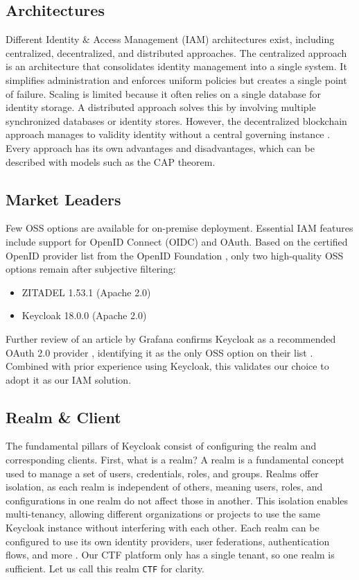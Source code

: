 \subsection{Architectures}
Different Identity \& Access Management (IAM) architectures exist, including centralized, decentralized, and distributed approaches. The centralized approach is an architecture that consolidates identity management into a single system. It simplifies administration and enforces uniform policies but creates a single point of failure. Scaling is limited because it often relies on a single database for identity storage. A distributed approach solves this by involving multiple synchronized databases or identity stores. However, the decentralized blockchain approach manages to validity identity without a central governing instance \cite{geeksforgeeks2025}. Every approach has its own advantages and disadvantages, which can be described with models such as the CAP theorem. 

\subsection{Market Leaders}
Few OSS options are available for on-premise deployment. Essential IAM features include support for OpenID Connect (OIDC) and OAuth. Based on the certified OpenID provider list from the OpenID Foundation \parencite{openidImplementations}, only two high-quality OSS options remain after subjective filtering:

\begin{itemize}
    \item ZITADEL 1.53.1 (Apache 2.0)
    \item Keycloak 18.0.0 (Apache 2.0)
\end{itemize}

Further review of an article by Grafana confirms Keycloak as a recommended OAuth 2.0 provider \parencite{keycloak}, identifying it as the only OSS option on their list \parencite{grafana_oauth}. Combined with prior experience using Keycloak, this validates our choice to adopt it as our IAM solution.

\subsection{Realm \& Client}
The fundamental pillars of Keycloak consist of configuring the realm and corresponding clients. First, what is a realm? A realm is a fundamental concept used to manage a set of users, credentials, roles, and groups. Realms offer isolation, as each realm is independent of others, meaning users, roles, and configurations in one realm do not affect those in another. This isolation enables multi-tenancy, allowing different organizations or projects to use the same Keycloak instance without interfering with each other. Each realm can be configured to use its own identity providers, user federations, authentication flows, and more \cite{keycloakDocs}. Our CTF platform only has a single tenant, so one realm is sufficient. Let us call this realm \texttt{CTF} for clarity.

